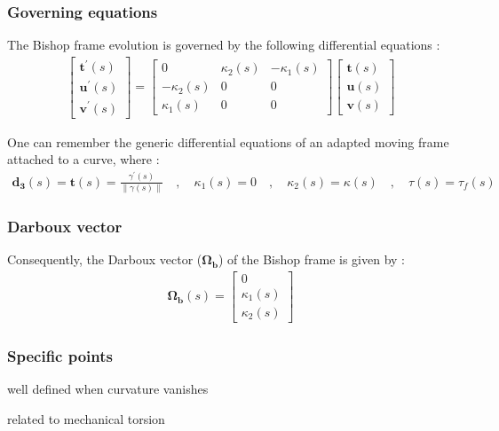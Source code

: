 \subsubsection{Governing equations}
The Bishop frame evolution is governed by the following differential equations :
\begin{gather}
\left[\begin{array}{c}
\mathbf{t^{'}}(s) \\
\mathbf{u^{'}}(s) \\
\mathbf{v^{'}}(s)
\end{array}\right]
=
\left[\begin{array}{ccc}
0 & \kappa_{2}(s) & -\kappa_{1}(s) \\
-\kappa_{2}(s) & 0 & 0 \\
\kappa_{1}(s) & 0 & 0
\end{array}\right]
\left[\begin{array}{c}
\mathbf{t}(s) \\
\mathbf{u}(s) \\
\mathbf{v}(s)
\end{array}\right]
\end{gather}

One can remember the generic differential equations of an adapted moving frame attached to a curve, where : 
\begin{gather}
\mathbf{d_{3}}(s) = \mathbf{t}(s) = \frac{\gamma^{'}(s)}{\|\gamma(s)\|}
\quad,\quad
\kappa_{1}(s) = 0
\quad,\quad
\kappa_{2}(s) = \kappa(s)
\quad,\quad
\tau(s) = \tau_{f}(s)
\end{gather}

\subsubsection{Darboux vector}
Consequently, the Darboux vector ($\mathbf{\Omega_{b}}$) of the Bishop frame is given by :
\begin{gather}
\mathbf{\Omega_b}(s) 
= 
\left[\begin{array}{c}
0\\
\kappa_1(s)\\
\kappa_2(s)
\end{array}\right]
\end{gather}

\subsubsection{Specific points}
well defined when curvature vanishes

related to mechanical torsion







